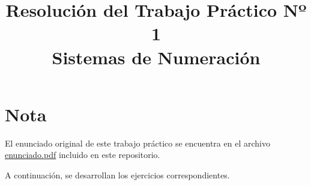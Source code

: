 \documentclass[12pt]{article}
\title{Resolución del Trabajo Práctico Nº 1\\\large Sistemas de Numeración}
\date{\date{Abril 2025}} %
\begin{document}
	
\maketitle

\section*{Nota}
El enunciado original de este trabajo práctico se encuentra en el archivo \href{./enunciado.pdf}{enunciado.pdf} incluido en este repositorio.

\vspace{0.5cm}

A continuación, se desarrollan los ejercicios correspondientes.
\end{document}
